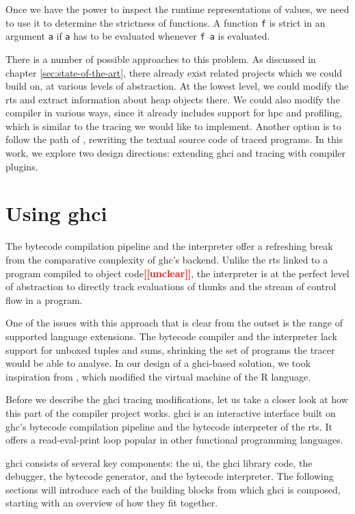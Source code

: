 \documentclass[thesis=B,english]{FITthesis}[2019/12/23]
\newcommand{\todo}[1]{\textcolor{red}{\textbf{[[#1]]}}}
\newcommand{\hsIdent}[1]{\texttt{#1}}
\newcommand{\hsCode}[1]{\texttt{#1}}
\begin{document}
Once we have the power to inspect the runtime representations of values, we
need to use it to determine the strictness of functions. A function \hsIdent{f}
is strict in an argument \hsIdent{a} if \hsIdent{a} has to be evaluated
whenever \hsCode{f a} is evaluated.

There is a number of possible approaches to this problem. As discussed in
chapter \ref{sec:state-of-the-art}, there already exist related projects which
we could build on, at various levels of abstraction. At the lowest level, we
could modify the \acrshort{rts} and extract information about heap objects
there. We could also modify the compiler in various ways, since it already
includes support for \acrshort{hpc} and profiling, which is similar to the
tracing we would like to implement. Another option is to follow the path of
, rewriting the textual source code of traced programs. In
this work, we explore two design directions: extending \acrshort{ghci} and
tracing with compiler plugins.

\section{Using \acrshort{ghci}} \label{sec:using-ghci}
The bytecode compilation pipeline and the interpreter offer a refreshing break
from the comparative complexity of \acrshort{ghc}'s backend. Unlike the
\acrshort{rts} linked to a program compiled to object code\todo{unclear}, the
interpreter is at the perfect level of abstraction to directly track
evaluations of thunks and the stream of control flow in a program.

One of the issues with this approach that is clear from the outset is the range
of supported language extensions. The bytecode compiler and the interpreter
lack support for un\-box\-ed tuples and sums, shrinking the set of programs the
tracer would be able to analyse. In our design of a \acrshort{ghci}-based
solution, we took inspiration from \cite{emp-study-laziness-r}, which modified
the virtual machine of the R language.

Before we describe the \acrshort{ghci} tracing modifications, let us take a
closer look at how this part of the compiler project works. \acrshort{ghci} is
an interactive interface built on \acrshort{ghc}'s bytecode compilation
pipeline and the bytecode interpreter of the \acrshort{rts}. It offers a
read-eval-print loop popular in other functional programming languages.

\acrshort{ghci} consists of several key components: the \acrshort{ui}, the
\acrshort{ghci} library code, the debugger, the bytecode generator, and the
bytecode interpreter. The following sections will introduce each of the
building blocks from which \acrshort{ghci} is composed, starting with an
overview of how they fit together.
\end{document}
